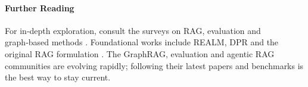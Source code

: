 \paragraph{Further Reading}  For in‑depth exploration, consult the surveys on RAG, evaluation and graph‑based methods \citep{gao2023rag_survey,huang2024rag_survey,yu2024rag_eval,sharma2025rag_survey,peng2024graphrag_survey}.  Foundational works include REALM, DPR and the original RAG formulation \citep{guu2020realm,karpukhin2020dense,lewis2020retrieval}.  The GraphRAG, evaluation and agentic RAG communities are evolving rapidly; following their latest papers and benchmarks is the best way to stay current.





